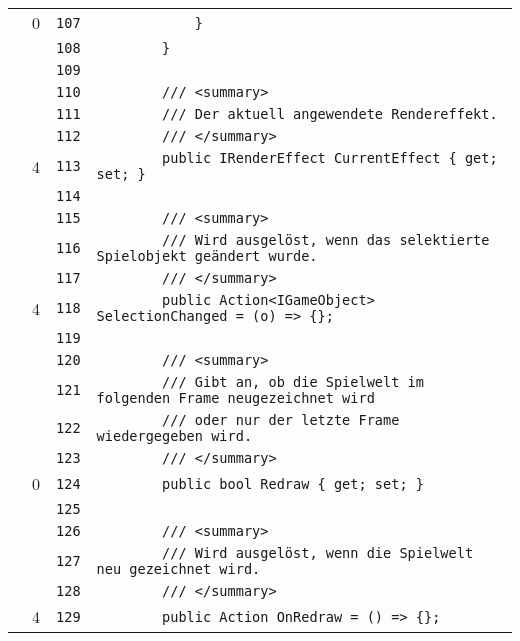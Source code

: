 \documentclass[a4paper,10pt]{article}
\begin{document}
\begin{longtable}[l]{lrrl}
\cellcolor{red} & 0 & \verb~107~ & \verb~            }~\\
\cellcolor{gray} &  & \verb~108~ & \verb~        }~\\
\cellcolor{gray} &  & \verb~109~ & \verb~~\\
\cellcolor{gray} &  & \verb~110~ & \verb~        /// <summary>~\\
\cellcolor{gray} &  & \verb~111~ & \verb~        /// Der aktuell angewendete Rendereffekt.~\\
\cellcolor{gray} &  & \verb~112~ & \verb~        /// </summary>~\\
\cellcolor{green} & 4 & \verb~113~ & \verb~        public IRenderEffect CurrentEffect { get; set; }~\\
\cellcolor{gray} &  & \verb~114~ & \verb~~\\
\cellcolor{gray} &  & \verb~115~ & \verb~        /// <summary>~\\
\cellcolor{gray} &  & \verb~116~ & \verb~        /// Wird ausgelöst, wenn das selektierte Spielobjekt geändert wurde.~\\
\cellcolor{gray} &  & \verb~117~ & \verb~        /// </summary>~\\
\cellcolor{green} & 4 & \verb~118~ & \verb~        public Action<IGameObject> SelectionChanged = (o) => {};~\\
\cellcolor{gray} &  & \verb~119~ & \verb~~\\
\cellcolor{gray} &  & \verb~120~ & \verb~        /// <summary>~\\
\cellcolor{gray} &  & \verb~121~ & \verb~        /// Gibt an, ob die Spielwelt im folgenden Frame neugezeichnet wird~\\
\cellcolor{gray} &  & \verb~122~ & \verb~        /// oder nur der letzte Frame wiedergegeben wird.~\\
\cellcolor{gray} &  & \verb~123~ & \verb~        /// </summary>~\\
\cellcolor{red} & 0 & \verb~124~ & \verb~        public bool Redraw { get; set; }~\\
\cellcolor{gray} &  & \verb~125~ & \verb~~\\
\cellcolor{gray} &  & \verb~126~ & \verb~        /// <summary>~\\
\cellcolor{gray} &  & \verb~127~ & \verb~        /// Wird ausgelöst, wenn die Spielwelt neu gezeichnet wird.~\\
\cellcolor{gray} &  & \verb~128~ & \verb~        /// </summary>~\\
\cellcolor{green} & 4 & \verb~129~ & \verb~        public Action OnRedraw = () => {};~\\

\end{longtable}
\end{document}
